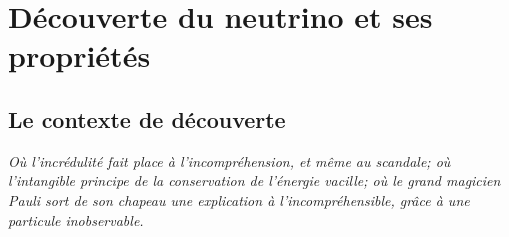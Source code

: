 
\section{Découverte du neutrino et ses propriétés}


%


\subsection{Le contexte de découverte}

\bigbreak

\begin{center}
\begin{minipage}{0.75\textwidth}
\textit{ \hspace*{5mm} \og Où l'incrédulité fait place à l'incompréhension, et même au scandale; où l'intangible principe de la conservation de l'énergie vacille; où le grand magicien Pauli sort de son chapeau une explication à l'incompréhensible, grâce à une particule inobservable. \fg{}}
\vspace{-3mm}




\end{minipage}
\end{center}

